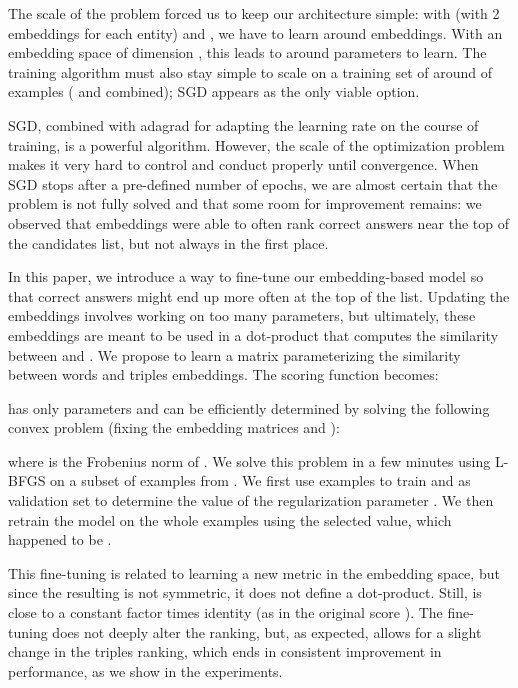 \documentclass[runningheads,a4paper]{llncs}
\begin{document}
The scale of the problem forced us to keep our architecture simple: with  (with 2 embeddings for each entity) and , we have to learn around  embeddings.
With an embedding space of dimension , this leads to around  parameters to learn.
The training algorithm must also stay simple to scale on a training set of around  of examples ( and  combined); SGD  appears as the only viable option.

SGD, combined with {\sc adagrad} for adapting the learning rate on the course of training, is a powerful algorithm.
However, the scale of the optimization problem makes it very hard to control and conduct properly until convergence.
When SGD stops after a pre-defined number of epochs, we are almost certain that the problem is not fully solved and that some room for improvement remains: we observed that embeddings were able to often rank correct answers near the top of the candidates list, but not always in the first place.

In this paper, we introduce a way to fine-tune our embedding-based model so that correct answers might end up more often at the top of the list.
Updating the embeddings involves working on too many parameters, but ultimately, these embeddings are meant to be used in a dot-product that computes the similarity between  and .
We propose to learn a matrix  parameterizing the similarity between words and triples embeddings.
The scoring function becomes:


 has only  parameters and can be efficiently determined by solving the following convex problem (fixing the embedding matrices  and ):

where  is the Frobenius norm of .
We solve this problem in a few minutes using L-BFGS on a subset of  examples from . We first use  examples to train and  as validation set to determine the value of the regularization parameter . We then retrain the model on the whole  examples using the selected value, which happened to be .

This fine-tuning is related to learning a new metric in the embedding space, but since the resulting  is not symmetric, it does not define a dot-product.
Still,  is close to a constant factor times identity (as in the original score ).
The fine-tuning does not deeply alter the ranking, but, as expected, allows for a slight change in the triples ranking, 
which ends in consistent improvement in performance, as we show in the experiments.
\end{document}

